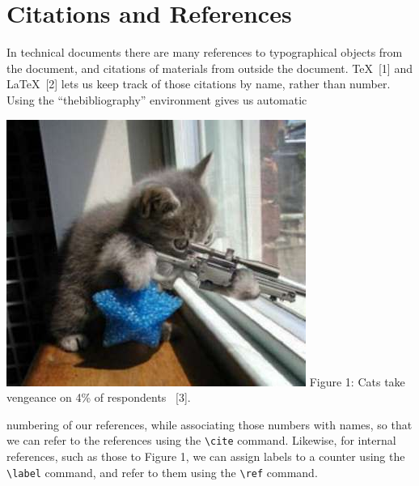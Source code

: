 \documentclass[12pt]{article}
\begin{document}
\section{Citations and References}
In technical documents there are many references to typographical objects
from the document, and citations of materials from outside the document.
\TeX \ [1] and \LaTeX \ [2] lets us keep track of those citations by name, rather
than number. Using the “thebibliography” environment gives us automatic
\newpage
\begin{center}
	\includegraphics{image.jpg}
	Figure 1: Cats take vengeance on 4\% of respondents \ [3].
\end{center}
numbering of our references, while associating those numbers with names,
so that we can refer to the references using the \verb|\cite| command. Likewise,
for internal references, such as those to Figure 1, we can assign labels to
a counter using the \verb|\label| command, and refer to them using the \verb|\ref|
command.
\end{document}
